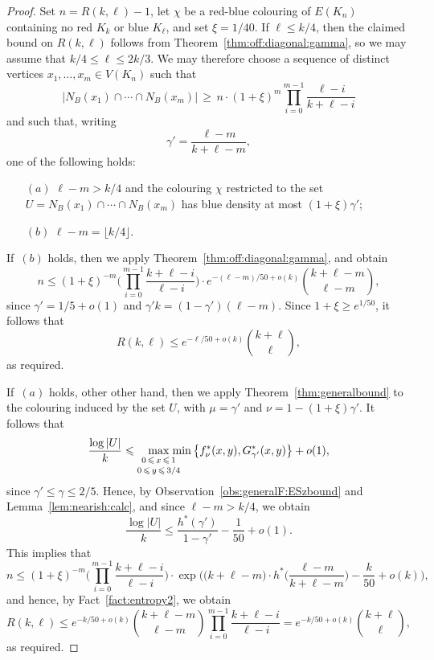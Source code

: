 \documentclass[12pt,reqno]{amsart}
\theoremstyle{definition}
\theoremstyle{remark}
\newcommand\N{\mathbb{N}}
\renewcommand{\le}{\leqslant}
\renewcommand{\ge}{\geqslant}
\def\N{\mathbb{N}}
\begin{document}
\begin{proof}
Set $n = R(k,\ell) - 1$, let $\chi$ be a red-blue colouring of $E(K_n)$ containing no red $K_k$ or blue $K_\ell$, and set $\xi = 1/40$. 
If $\ell \le k/4$, then the claimed bound on $R(k,\ell)$ follows from Theorem~\ref{thm:off:diagonal:gamma}, so we may assume that $k/4 \le \ell \le 2k/3$. We may therefore choose a sequence of distinct vertices $x_1,\ldots,x_m \in V(K_n)$ such that
\begin{equation}\label{eq:after:ESz:steps}
|N_B(x_1) \cap \cdots \cap N_B(x_m)| \, \ge \, n \cdot(1 + \xi)^m \prod_{i = 0}^{m-1} \frac{\ell - i}{k + \ell - i}
\end{equation}
and such that, writing 
$$\gamma' = \frac{\ell - m}{k + \ell - m},$$
one of the following holds:%
\begin{itemize}
\item[$(a)$] $\ell - m > k/4$ and the colouring $\chi$ restricted to the set $U = N_B(x_1) \cap \cdots \cap N_B(x_m)$ has blue density at most $(1 + \xi)\gamma'$;\smallskip
\item[$(b)$] $\ell - m = \lfloor k/4 \rfloor$.\smallskip
\end{itemize}

\pagebreak

If~$(b)$ holds, then we apply Theorem~\ref{thm:off:diagonal:gamma}, and obtain
$$n \le (1+\xi)^{-m} \bigg( \prod_{i = 0}^{m-1} \frac{k + \ell - i}{\ell - i} \bigg) \cdot e^{-(\ell-m)/50 + o(k)} {k + \ell - m \choose \ell - m},$$
since $\gamma' = 1/5 + o(1)$ and $\gamma' k = (1-\gamma')(\ell - m)$. Since $1 + \xi \ge e^{1/50}$, it follows that
$$R(k,\ell) \le e^{-\ell/50 + o(k)} {k + \ell \choose \ell},$$
as required.

If~$(a)$ holds, other other hand, then we apply Theorem~\ref{thm:generalbound} to the colouring induced by the set $U$, with $\mu = \gamma'$ and $\nu = 1 - (1 + \xi)\gamma'$. It follows that %
$$\frac{\log |U|}{k} \le \max_{\substack{\\[-0.05ex] 0 \,\le\, x \,\le\, 1 \\[+0.3ex] 0 \,\le\, y \,\le\, 3/4}} \hspace{-0.3cm} \min \big\{ f^*_\nu (x,y),G^*_{\gamma'}(x,y) \big\} + o(1),$$
since $\gamma' \le \gamma \le 2/5$. Hence, by Observation~\ref{obs:generalF:ESzbound} and Lemma~\ref{lem:nearish:calc}, and since $\ell - m > k/4$, we obtain
$$\frac{\log |U|}{k} \le \frac{h^*(\gamma')}{1-\gamma'} - \frac{1}{50} + o(1).$$
This implies that
$$n \le (1+\xi)^{-m} \bigg( \prod_{i = 0}^{m-1} \frac{k + \ell - i}{\ell - i} \bigg) \cdot \exp\bigg( \big( k + \ell - m \big) \cdot h^*\bigg( \frac{\ell - m}{k + \ell - m} \bigg) - \frac{k}{50}  + o(k) \bigg),$$
and hence, by Fact~\ref{fact:entropy2}, we obtain
$$R(k,\ell) \le e^{-k/50 + o(k)} {k + \ell - m \choose \ell - m} \prod_{i = 0}^{m-1} \frac{k + \ell - i}{\ell - i} = e^{-k/50 + o(k)} {k + \ell \choose \ell},$$
as required. 
\end{proof} 
 
\end{document}
